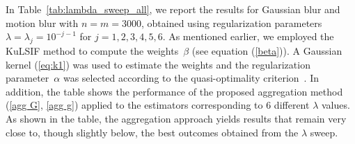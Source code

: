 \documentclass[twoside,11pt]{article}
\begin{document}
\vspace{0.5em}

\newpage

\noindent
In Table~\ref{tab:lambda_sweep_all}, we report the results for Gaussian blur and motion blur with $n = m = 3000$, obtained using regularization parameters $\lambda = \lambda_j = 10^{-j-1}$ for $j = 1,2,3,4,5,6$. As mentioned earlier, we employed the KuLSIF method to compute the weights~$\beta$ (see equation (\ref{beta})). 
A Gaussian kernel (\ref{eq:k1}) was used to estimate the weights and the regularization 
parameter~$\alpha$ was selected according to the quasi-optimality criterion~\cite{ALPHA-SELECTION}.
In addition, the table  shows the performance of the proposed aggregation method (\ref{agg G}, \ref{agg g}) applied to the estimators corresponding to 6 different $\lambda$ values. As shown in the table, the aggregation approach yields results that remain very close to, though slightly below, the best outcomes obtained from the $\lambda$ sweep.
\end{document}

